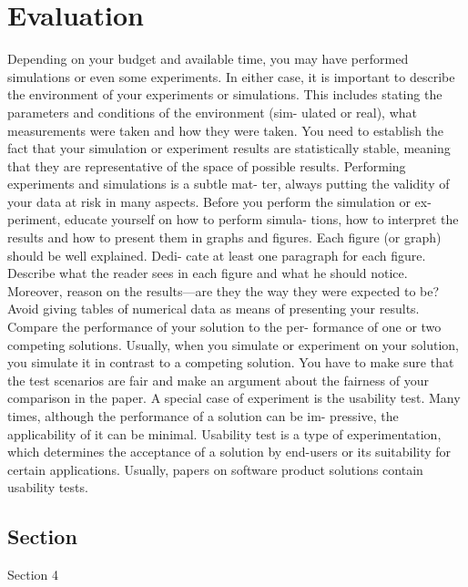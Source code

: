 
\chapter{Evaluation}
\label{chap:evaluation}

Depending on your budget and available time, you may
have performed simulations or even some experiments. In
either case, it is important to describe the environment
of your experiments or simulations. This includes stating
the parameters and conditions of the environment (sim-
ulated or real), what measurements were taken and how
they were taken.
You need to establish the fact that your simulation or
experiment results are statistically stable, meaning that
they are representative of the space of possible results.
Performing experiments and simulations is a subtle mat-
ter, always putting the validity of your data at risk in
many aspects. Before you perform the simulation or ex-
periment, educate yourself on how to perform simula-
tions, how to interpret the results and how to present
them in graphs and figures.
Each figure (or graph) should be well explained. Dedi-
cate at least one paragraph for each figure. Describe what
the reader sees in each figure and what he should notice.
Moreover, reason on the results—are they the way they
were expected to be? Avoid giving tables of numerical
data as means of presenting your results.
Compare the performance of your solution to the per-
formance of one or two competing solutions. Usually,
when you simulate or experiment on your solution, you
simulate it in contrast to a competing solution. You have
to make sure that the test scenarios are fair and make an
argument about the fairness of your comparison in the
paper.
A special case of experiment is the usability test. Many
times, although the performance of a solution can be im-
pressive, the applicability of it can be minimal. Usability
test is a type of experimentation, which determines the
acceptance of a solution by end-users or its suitability for
certain applications. Usually, papers on software product
solutions contain usability tests.

\section{Section}

Section 4
